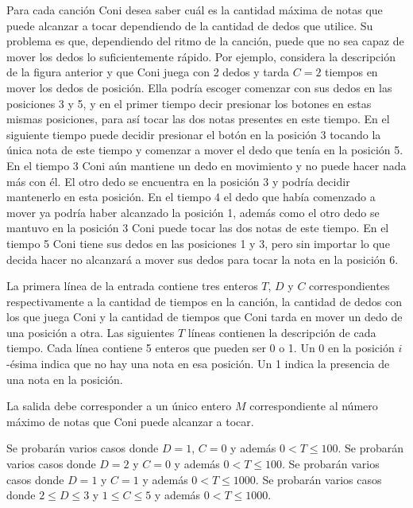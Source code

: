 \documentclass{oci}
\begin{document}
\begin{problemDescription}
  Para cada canción Coni desea saber cuál es la cantidad máxima de notas que
  puede alcanzar a tocar dependiendo de la cantidad de dedos que utilice.
  Su problema es que, dependiendo del ritmo de la canción, puede que no sea
  capaz de mover los dedos lo suficientemente rápido.
  Por ejemplo, considera la descripción de la figura anterior y que Coni juega
  con 2 dedos y tarda $C=2$ tiempos en mover los dedos de posición.
  Ella podría escoger comenzar con sus dedos en las posiciones 3 y 5, y en el
  primer tiempo decir presionar los botones en estas mismas posiciones, para así
  tocar las dos notas presentes en este tiempo.
  En el siguiente tiempo puede decidir presionar el botón en la posición 3
  tocando la única nota de este tiempo y comenzar a mover el dedo que
  tenía en la posición 5.
  En el tiempo 3 Coni aún mantiene un dedo en movimiento y no puede hacer nada
  más con él.
  El otro dedo se encuentra en la posición 3 y podría decidir mantenerlo en esta
  posición.
  En el tiempo 4 el dedo que había comenzado a mover ya podría haber alcanzado
  la posición 1, además como el otro dedo se mantuvo en la posición 3 Coni puede
  tocar las dos notas de este tiempo.
  En el tiempo 5 Coni tiene sus dedos en las posiciones 1 y 3, pero sin importar
  lo que decida hacer no alcanzará a mover sus dedos para tocar la nota en la
  posición 6.
\end{problemDescription}
\begin{inputDescription}
  La primera línea de la entrada contiene tres enteros $T$, $D$ y $C$
  correspondientes respectivamente a la cantidad de tiempos en la canción, la
  cantidad de dedos con los que juega Coni y la cantidad de tiempos que Coni
  tarda en mover un dedo de una posición a otra.
  Las siguientes $T$ líneas contienen la descripción de cada tiempo.
  Cada línea contiene 5 enteros que pueden ser 0 o 1.
  Un 0 en la posición $i$-ésima indica que no hay una nota en esa posición.
  Un 1 indica la presencia de una nota en la posición.
\end{inputDescription}

\begin{outputDescription}
  La salida debe corresponder a un único entero $M$ correspondiente al número
  máximo de notas que Coni puede alcanzar a tocar.
\end{outputDescription}

\begin{scoreDescription}
   Se probarán varios casos donde $D = 1$, $C = 0$ y además $0 < T \le 100$.
   Se probarán varios casos donde $D = 2$ y $C = 0$ y además $0 < T \le 100$.
   Se probarán varios casos donde $D = 1$ y $C = 1$ y además $0 < T \le 1000$.
   Se probarán varios casos donde $2 \le D \le 3$ y $1 \le C \le 5$ y
  además $0 < T \le 1000$.
\end{scoreDescription}

\begin{sampleDescription}
\end{sampleDescription}
\end{document}
